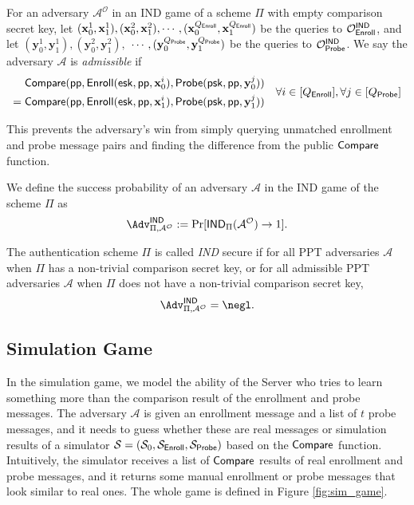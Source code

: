 \begin{definition}
\label{def:admissible}
	For an adversary $\mathcal{A}^\mathcal{O}$ in an IND game of a scheme $\Pi$ with empty comparison secret key, let $(\mathbf{x}_0^1, \mathbf{x}_1^1), (\mathbf{x}_0^2, \mathbf{x}_1^2), \cdots, (\mathbf{x}_0^{Q_{\sf Enroll}}, \mathbf{x}_1^{Q_{\sf Enroll}})$ be the queries to $\mathcal{O}_{\sf Enroll}^{\sf IND}$, and let $(\mathbf{y}_0^1, \mathbf{y}_1^1), (\mathbf{y}_0^2, \mathbf{y}_1^2),$ $\cdots, (\mathbf{y}_0^{Q_{\sf Probe}}, \mathbf{y}_1^{Q_{\sf Probe}})$ be the queries to $\mathcal{O}_{\sf Probe}^{\sf IND}$. We say the adversary $\mathcal{A}$ is \emph{admissible} if
	\[
		\begin{aligned}
			& {\sf Compare}( {\sf pp}, {\sf Enroll}({\sf esk}, {\sf pp}, \mathbf{x}_0^i), {\sf Probe}({\sf psk}, {\sf pp}, \mathbf{y}_0^j) ) \\
			= \; & {\sf Compare}( {\sf pp}, {\sf Enroll}({\sf esk}, {\sf pp}, \mathbf{x}_1^i), {\sf Probe}({\sf psk}, {\sf pp}, \mathbf{y}_1^j) )
		\end{aligned}
		\quad \forall i \in [Q_{\sf Enroll}], \forall j \in [Q_{\sf Probe}]
	\]
	

\end{definition}

This prevents the adversary's win from simply querying unmatched enrollment and probe message pairs and finding the difference from the public $\sf Compare$ function.

We define the success probability of an adversary $\mathcal{A}$ in the IND game of the scheme $\Pi$ as
\[
	\Adv^{\sf IND}_{\Pi, \mathcal{A}^\mathcal{O}} := \Pr[{\sf IND}_{\Pi}(\mathcal{A}^\mathcal{O}) \to 1].
\]

The authentication scheme $\Pi$ is called \emph{IND} secure if for all PPT adversaries $\mathcal{A}$ when $\Pi$ has a non-trivial comparison secret key, or for all admissible PPT adversaries $\mathcal{A}$ when $\Pi$ does not have a non-trivial comparison secret key,
\[
	\Adv^{\sf IND}_{\Pi, \mathcal{A^\mathcal{O}}} = \negl.
\]


\subsection{Simulation Game}
\label{sec:simulation_game}

In the simulation game, we model the ability of the {\sf Server} who tries to learn something more than the comparison result of the enrollment and probe messages. The adversary $\mathcal{A}$ is given an enrollment message and a list of $t$ probe messages, and it needs to guess whether these are real messages or simulation results of a simulator $\mathcal{S} = (\mathcal{S}_0, \mathcal{S}_{\sf Enroll}, \mathcal{S}_{\sf Probe})$ based on the $\sf Compare$ function. Intuitively, the simulator receives a list of $\sf Compare$ results of real enrollment and probe messages, and it returns some manual enrollment or probe messages that look similar to real ones. The whole game is defined in Figure \ref{fig:sim_game}.


